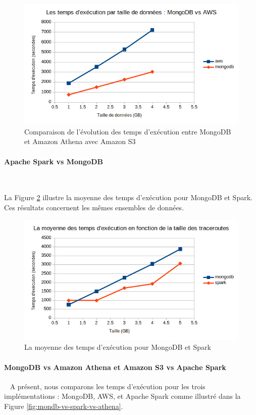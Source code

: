 \begin{figure}[H]
	\centering
	\captionsetup{justification=centering}
	\includegraphics[width=0.7\linewidth]{illustrations/mondb-vs-athena}
	\caption{Comparaison de l'évolution des temps d'exécution entre MongoDB et Amazon Athena avec Amazon S3}
	\label{fig:mondb-vs-athena}
\end{figure}

\paragraph{Apache Spark vs MongoDB}~

La Figure \ref{fig:mongodbvsspark} illustre la moyenne des temps d'exécution pour MongoDB et Spark. Ces résultats concernent les mêmes ensembles de données.

\begin{figure}[H]
	\centering
	\includegraphics[width=0.7\linewidth]{../testPerformances/mongodbvsspark}
	\caption{La moyenne des temps d'exécution pour MongoDB et Spark}
	\label{fig:mongodbvsspark}
\end{figure}

\paragraph{MongoDB vs Amazon Athena et Amazon S3 vs Apache Spark }~
A présent, nous comparons les temps d'exécution pour les trois implémentations : MongoDB, AWS, et Apache Spark comme illustré dans la Figure 	\ref{fig:mondb-vs-spark-vs-athena}. 

